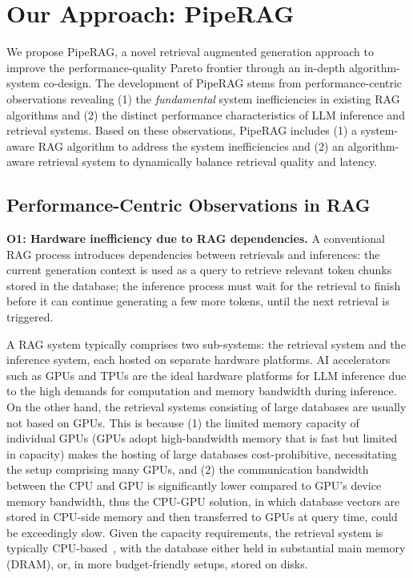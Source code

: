 \section{Our Approach: PipeRAG}
\label{sec:approach}

We propose PipeRAG, a novel retrieval augmented generation approach to improve the performance-quality Pareto frontier through an in-depth algorithm-system co-design.
The development of PipeRAG stems from performance-centric observations revealing (1) the \textit{fundamental} system inefficiencies in existing RAG algorithms and (2) the distinct performance characteristics of LLM inference and retrieval systems. 
Based on these observations, PipeRAG includes (1) a system-aware RAG algorithm to address the system inefficiencies and (2) an algorithm-aware retrieval system to dynamically balance retrieval quality and latency. 

\subsection{Performance-Centric Observations in RAG}
 
\textbf{O1: Hardware inefficiency due to RAG dependencies.} A conventional RAG process introduces dependencies between retrievals and inferences: the current generation context is used as a query to retrieve relevant token chunks stored in the database; the inference process must wait for the retrieval to finish before it can continue generating a few more tokens, until the next retrieval is triggered.

A RAG system typically comprises two sub-systems: the retrieval system and the inference system, each hosted on separate hardware platforms.
AI accelerators such as GPUs and TPUs are the ideal hardware platforms for LLM inference due to the high demands for computation and memory bandwidth during inference. 
On the other hand, the retrieval systems consisting of large databases are usually not based on GPUs. This is because (1) the limited memory capacity of individual GPUs (GPUs adopt high-bandwidth memory that is fast but limited in capacity) makes the hosting of large databases cost-prohibitive, necessitating the setup comprising many GPUs, and (2) the communication bandwidth between the CPU and GPU is significantly lower compared to GPU's device memory bandwidth, thus the CPU-GPU solution, in which database vectors are stored in CPU-side memory and then transferred to GPUs at query time, could be exceedingly slow.
Given the capacity requirements, the retrieval system is typically CPU-based~\cite{borgeaud2022improving, lewis2020retrieval}, with the database either held in substantial main memory (DRAM), or, in more budget-friendly setups, stored on disks. 

